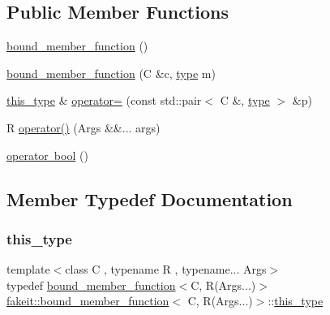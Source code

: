 \subsection*{Public Member Functions}
\begin{DoxyCompactItemize}
\item 
\mbox{\hyperlink{classfakeit_1_1bound__member__function_3_01C_00_01R_07Args_8_8_8_08_4_a2e12e6d27adcf93c45c0b64aed767b10}{bound\+\_\+member\+\_\+function}} ()
\item 
\mbox{\hyperlink{classfakeit_1_1bound__member__function_3_01C_00_01R_07Args_8_8_8_08_4_a96b71d3d4beae9d121f85cd73d541c59}{bound\+\_\+member\+\_\+function}} (C \&c, \mbox{\hyperlink{classfakeit_1_1bound__member__function_3_01C_00_01R_07Args_8_8_8_08_4_ac79ac3937ebd63418a5873c044c22cf9}{type}} m)
\item 
\mbox{\hyperlink{classfakeit_1_1bound__member__function_3_01C_00_01R_07Args_8_8_8_08_4_a65c1f42260047efb95028bc0ac5a8f09}{this\+\_\+type}} \& \mbox{\hyperlink{classfakeit_1_1bound__member__function_3_01C_00_01R_07Args_8_8_8_08_4_a797454657783b4b13712d40f0e9a1a6f}{operator=}} (const std\+::pair$<$ C \&, \mbox{\hyperlink{classfakeit_1_1bound__member__function_3_01C_00_01R_07Args_8_8_8_08_4_ac79ac3937ebd63418a5873c044c22cf9}{type}} $>$ \&p)
\item 
R \mbox{\hyperlink{classfakeit_1_1bound__member__function_3_01C_00_01R_07Args_8_8_8_08_4_a403d7a7bf0ca3173ed2bf9ce16b8af6f}{operator()}} (Args \&\&... args)
\item 
\mbox{\hyperlink{classfakeit_1_1bound__member__function_3_01C_00_01R_07Args_8_8_8_08_4_a2d60df3ab6ccf7d9d16d9756153d2528}{operator bool}} ()
\end{DoxyCompactItemize}


\subsection{Member Typedef Documentation}
\mbox{\label{classfakeit_1_1bound__member__function_3_01C_00_01R_07Args_8_8_8_08_4_a65c1f42260047efb95028bc0ac5a8f09}} 
\subsubsection{\texorpdfstring{this\_type}{this\_type}}
{\footnotesize\ttfamily template$<$class C , typename R , typename... Args$>$ \\
typedef \mbox{\hyperlink{classfakeit_1_1bound__member__function}{bound\+\_\+member\+\_\+function}}$<$C, R(Args...)$>$ \mbox{\hyperlink{classfakeit_1_1bound__member__function}{fakeit\+::bound\+\_\+member\+\_\+function}}$<$ C, R(Args...)$>$\+::\mbox{\hyperlink{classfakeit_1_1bound__member__function_3_01C_00_01R_07Args_8_8_8_08_4_a65c1f42260047efb95028bc0ac5a8f09}{this\+\_\+type}}}

